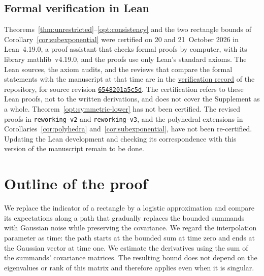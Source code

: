 \documentclass[11pt,letterpaper]{article}
\theoremstyle{remark}
\begin{document}
\subsection{\texorpdfstring{Formal verification in Lean}{Formal verification in Lean}}\label{sec:lean-certification}
\leavevmode Theorems~\ref{thm:unrestricted}--\ref{opt:consistency} and the two rectangle bounds of
Corollary~\ref{cor:subexponential} were certified on 20 and 21~October 2026
in Lean~4.19.0, a proof assistant that checks formal proofs by computer,
with its library mathlib~v4.19.0, and the proofs use only Lean's standard
axioms. The Lean sources, the axiom audits, and the reviews that compare the
formal statements with the manuscript at that time are in the
\href{https://github.com/VC2015/HDCLTs/blob/bbf1ab99c733a398c181ca8c9f5a243a41f258c6/verification/2026-10-21-companion-results/README.md}{verification record}
of the repository, for source revision
\href{https://github.com/VC2015/HDCLTs/commit/6548201a5c5d9c132a53f1d504f7ef70346aa782}{\texttt{6548201a5c5d}}.
The certification refers to these Lean proofs, not to the written
derivations, and does not cover the Supplement as a whole.
Theorem~\ref{opt:symmetric-lower} has not been certified.
The revised proofs in \texttt{reworking-v2} and \texttt{reworking-v3}, and the polyhedral extensions in Corollaries~\ref{cor:polyhedra}
and~\ref{cor:subexponential}, have not been re-certified.
Updating the Lean development and checking its correspondence with this
version of the manuscript remain to be done.

\section{Outline of the proof}
\label{sec:smoothing}

We replace the indicator of a rectangle by a logistic approximation and
compare its expectations along a path that gradually replaces the bounded
summands with Gaussian noise while preserving the covariance. We regard
the interpolation parameter as time: the path starts at the bounded sum
at time zero and ends at the Gaussian vector at time one. We estimate
the derivatives using the sum of the summands' covariance matrices.
The resulting bound does not depend on the eigenvalues or rank of this
matrix and therefore applies even when it is singular.
\end{document}
